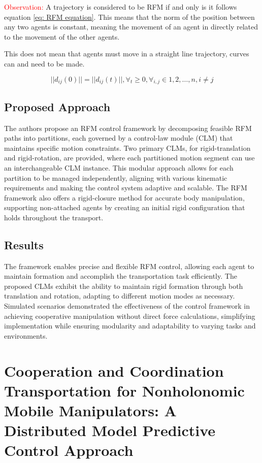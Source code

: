 \documentclass[a4paper,12pt]{article}
\begin{document}
\textcolor{red}{Observation:}
A trajectory is considered to be RFM if and only is it follows equation \ref{eq: RFM equation}. This means that the norm of the position between any two agents is constant, meaning the movement of an agent in directly related to the movement of the other agents.

This does not mean that agents must move in a straight line trajectory, curves can and need to be made.

\begin{equation}
	||d_{ij} (0)|| = || d_{ij} (t)||, \forall_{t} \geq 0, \forall_{i,j} \in {1, 2, \dots, n}, i \neq j
	\label{eq: RFM equation}
\end{equation}

\subsection{Proposed Approach}
The authors propose an RFM control framework by decomposing feasible RFM paths into partitions, each governed by a control-law module (CLM) that maintains specific motion constraints. Two primary CLMs, for rigid-translation and rigid-rotation, are provided, where each partitioned motion segment can use an interchangeable CLM instance. This modular approach allows for each partition to be managed independently, aligning with various kinematic requirements and making the control system adaptive and scalable. The RFM framework also offers a rigid-closure method for accurate body manipulation, supporting non-attached agents by creating an initial rigid configuration that holds throughout the transport.

\subsection{Results}
The framework enables precise and flexible RFM control, allowing each agent to maintain formation and accomplish the transportation task efficiently. The proposed CLMs exhibit the ability to maintain rigid formation through both translation and rotation, adapting to different motion modes as necessary. Simulated scenarios demonstrated the effectiveness of the control framework in achieving cooperative manipulation without direct force calculations, simplifying implementation while ensuring modularity and adaptability to varying tasks and environments.


\section{\small Cooperation and Coordination Transportation for
Nonholonomic Mobile Manipulators: A Distributed
Model Predictive Control Approach}
\end{document}
